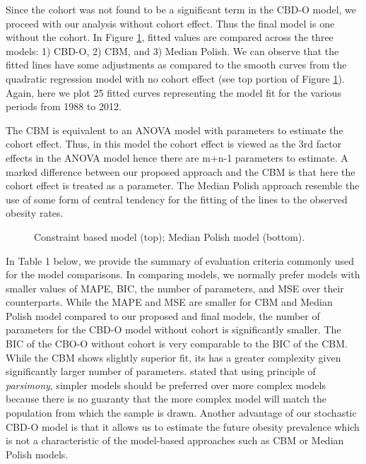 \documentclass[11pt,letterpaper]{article}
\numberwithin{equation}{section}
\begin{document}
Since the cohort was not found to be a significant term in the CBD-O model, we proceed with our analysis without cohort effect. Thus the final model is one without the cohort. In Figure \ref{fig:3pl}, fitted values are compared across the three models: 1) CBD-O, 2) CBM, and 3) Median Polish. We can observe that the fitted lines have some adjustments as compared to the smooth curves from the quadratic regression model with no cohort effect (see top portion of Figure \ref{fig:3pl}). Again, here we plot 25 fitted curves representing the model fit for the various periods from 1988 to 2012.

The CBM is equivalent to an ANOVA model with parameters to estimate the cohort effect. Thus, in this model the cohort effect is viewed as the 3rd factor effects in the ANOVA model hence there are m+n-1 parameters to estimate.  A marked difference between our proposed approach and the CBM is that here the cohort effect is treated as a parameter. The Median Polish approach resemble the use of some form of central tendency for the fitting of the lines to the observed obesity rates.
\begin{figure}
\begin{center}
{}
{}
\caption{\label{fig:3pl} Constraint based model (top); Median Polish model (bottom).}
\end{center}
\end{figure}

In Table 1 below, we provide the summary of evaluation criteria commonly used for the model comparisons. In comparing models, we normally prefer models with smaller values of MAPE, BIC, the number of parameters, and MSE over their counterparts. While the MAPE and MSE are smaller for CBM and Median Polish model compared to our proposed and final models, the number of parameters for the CBD-O model without cohort is significantly smaller. The BIC of the CBO-O without cohort is very comparable to the BIC of the CBM. While the CBM shows slightly superior fit, its has a greater complexity given significantly larger number of parameters. \cite{Klugman+Panjer+Willmot:2012} stated that using principle of {\it parsimony}, simpler models should be preferred over more complex models because there is no guaranty that the more complex model will match the population from which the sample is drawn. Another advantage of our stochastic CBD-O model is that it allows us to estimate the future obesity prevalence which is not a characteristic of the model-based approaches such as CBM or Median Polish models.
\end{document}
